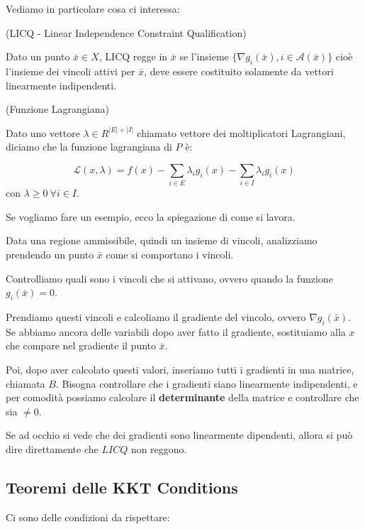 Vediamo in particolare cosa ci interessa:

\begin{definition}
    (LICQ - Linear Independence Constraint Qualification)

    Dato un punto $\bar{x} \in X$, LICQ regge in $\bar{x}$ se l'insieme $\{\nabla g_i(\bar{x}), i \in \mathcal{A}(\bar{x})\}$ 
    cioè l'insieme dei vincoli attivi per $\bar{x}$, deve essere costituito solamente da vettori linearmente indipendenti.
\end{definition}

\begin{definition}
    (Funzione Lagrangiana)

    Dato uno vettore $\lambda \in R^{|E|+|I|}$ chiamato vettore dei moltiplicatori Lagrangiani, diciamo che la funzione lagrangiana di $P$ è:

    $$
    \mathcal{L}(x,\lambda) = f(x) - \sum_{i \in E} \lambda_i g_i(x) - \sum_{i \in I} \lambda_i g_i(x)   
    $$
    con $\lambda \geq 0 \ \forall i \in I$. 
\end{definition}

Se vogliamo fare un esempio, ecco la spiegazione di come si lavora.

Data una regione ammissibile, quindi un insieme di vincoli, analizziamo prendendo un punto $\bar{x}$
come si comportano i vincoli.

Controlliamo quali sono i vincoli che si attivano, ovvero quando la funzione $g_i(\bar{x}) = 0$.

Prendiamo questi vincoli e calcoliamo il gradiente del vincolo, ovvero $\nabla g_i(\bar{x})$.
Se abbiamo ancora delle variabili dopo aver fatto il gradiente, sostituiamo alla $x$ che 
compare nel gradiente il punto $\bar{x}$.

Poi, dopo aver calcolato questi valori, inseriamo tutti i gradienti in una matrice, chiamata $B$. 
Bisogna controllare che i gradienti siano linearmente indipendenti, e per comodità
possiamo calcolare il \textbf{determinante} della matrice e controllare che sia $\neq 0$.

Se ad occhio si vede che dei gradienti sono linearmente dipendenti, allora si può dire 
direttamente che $LICQ$ non reggono.

\subsection{Teoremi delle KKT Conditions}

Ci sono delle condizioni da rispettare:

